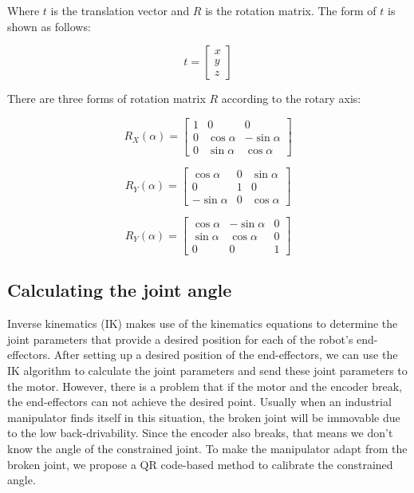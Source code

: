 \documentclass{ieeeaccess}
\begin{document}
Where $t$ is the translation vector and $R$ is the rotation matrix. The form of $t$ is shown as follows:

\begin{equation}
t =  \left[
\begin{array}{ccc}
x\\
y \\
z
\end{array}
\right] 
\end{equation}

There are three forms of rotation matrix $R$ according to the rotary axis:

\begin{equation}
R_X(\alpha) = 
\left[
\begin{matrix}
1 & 0 & 0 \\
0 & \cos\alpha & -\sin\alpha \\
0 & \sin\alpha & \cos\alpha
\end{matrix}
\right] 
\label{rotation:x}
\end{equation}

\begin{equation}
R_Y(\alpha) = 
\left[
\begin{matrix}
\cos\alpha & 0 & \sin\alpha \\
0 & 1 & 0 \\
-\sin\alpha & 0 & \cos\alpha
\end{matrix}
\right] 
\label{rotation:y}
\end{equation}

\begin{equation}
R_Y(\alpha) = 
\left[
\begin{matrix}
\cos\alpha & -\sin\alpha & 0 \\
\sin\alpha & \cos\alpha & 0 \\
0 & 0 & 1
\end{matrix}
\right] 
\label{rotation:z}
\end{equation}



\subsection{Calculating the joint angle}

Inverse kinematics (IK) makes use of the kinematics equations to determine the joint parameters that provide a desired position for each of the robot's end-effectors.
After setting up a desired position of the end-effectors, we can use the IK algorithm to calculate the joint parameters and send these joint parameters to the motor. However, there is a problem that if the motor and the encoder break, the end-effectors can not achieve the desired point. Usually when an industrial manipulator finds itself in this situation, the broken joint will be immovable due to the low back-drivability. Since the encoder also breaks, that means we don't know the angle of the constrained joint. To make the manipulator adapt from the broken joint, we propose a QR code-based method to calibrate the constrained angle.  
\end{document}
